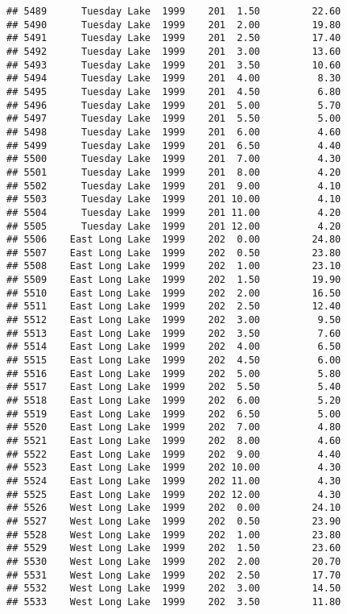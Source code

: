 \documentclass[
]{article}
\begin{document}
\begin{verbatim}
## 5489      Tuesday Lake  1999    201  1.50         22.60
## 5490      Tuesday Lake  1999    201  2.00         19.80
## 5491      Tuesday Lake  1999    201  2.50         17.40
## 5492      Tuesday Lake  1999    201  3.00         13.60
## 5493      Tuesday Lake  1999    201  3.50         10.60
## 5494      Tuesday Lake  1999    201  4.00          8.30
## 5495      Tuesday Lake  1999    201  4.50          6.80
## 5496      Tuesday Lake  1999    201  5.00          5.70
## 5497      Tuesday Lake  1999    201  5.50          5.00
## 5498      Tuesday Lake  1999    201  6.00          4.60
## 5499      Tuesday Lake  1999    201  6.50          4.40
## 5500      Tuesday Lake  1999    201  7.00          4.30
## 5501      Tuesday Lake  1999    201  8.00          4.20
## 5502      Tuesday Lake  1999    201  9.00          4.10
## 5503      Tuesday Lake  1999    201 10.00          4.10
## 5504      Tuesday Lake  1999    201 11.00          4.20
## 5505      Tuesday Lake  1999    201 12.00          4.20
## 5506    East Long Lake  1999    202  0.00         24.80
## 5507    East Long Lake  1999    202  0.50         23.80
## 5508    East Long Lake  1999    202  1.00         23.10
## 5509    East Long Lake  1999    202  1.50         19.90
## 5510    East Long Lake  1999    202  2.00         16.50
## 5511    East Long Lake  1999    202  2.50         12.40
## 5512    East Long Lake  1999    202  3.00          9.50
## 5513    East Long Lake  1999    202  3.50          7.60
## 5514    East Long Lake  1999    202  4.00          6.50
## 5515    East Long Lake  1999    202  4.50          6.00
## 5516    East Long Lake  1999    202  5.00          5.80
## 5517    East Long Lake  1999    202  5.50          5.40
## 5518    East Long Lake  1999    202  6.00          5.20
## 5519    East Long Lake  1999    202  6.50          5.00
## 5520    East Long Lake  1999    202  7.00          4.80
## 5521    East Long Lake  1999    202  8.00          4.60
## 5522    East Long Lake  1999    202  9.00          4.40
## 5523    East Long Lake  1999    202 10.00          4.30
## 5524    East Long Lake  1999    202 11.00          4.30
## 5525    East Long Lake  1999    202 12.00          4.30
## 5526    West Long Lake  1999    202  0.00         24.10
## 5527    West Long Lake  1999    202  0.50         23.90
## 5528    West Long Lake  1999    202  1.00         23.80
## 5529    West Long Lake  1999    202  1.50         23.60
## 5530    West Long Lake  1999    202  2.00         20.70
## 5531    West Long Lake  1999    202  2.50         17.70
## 5532    West Long Lake  1999    202  3.00         14.50
## 5533    West Long Lake  1999    202  3.50         11.80

\end{verbatim}
\end{document}
